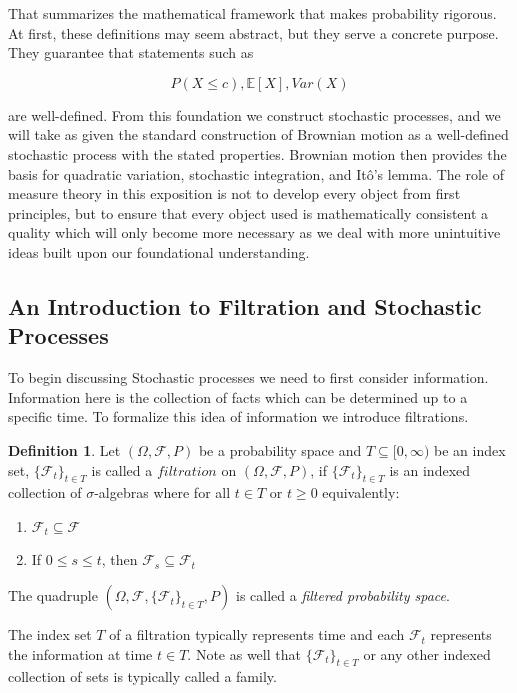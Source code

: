 \documentclass[12pt]{article}
\theoremstyle{definition}
\newtheorem{definition}{Definition}[section]
\theoremstyle{plain}
\theoremstyle{remark}
\begin{document}
That summarizes the mathematical framework that makes probability rigorous. At first, these definitions may seem abstract, but they serve a concrete purpose. They guarantee that statements such as

$$P(X \leq c),\mathbb{E}[X],Var(X)$$

are well-defined.  From this foundation we construct stochastic processes, and we will take as given the standard construction of Brownian motion as a well-defined stochastic process with the stated properties. Brownian motion then provides the basis for quadratic variation, stochastic integration, and Itô's lemma.  The role of measure theory in this exposition is not to develop every object from first principles, but to ensure that every object used is mathematically consistent a quality which will only become more necessary as we deal with more unintuitive ideas built upon our foundational understanding.

\subsection{An Introduction to Filtration and Stochastic Processes}

To begin discussing Stochastic processes we need to first consider information.  Information here is the collection of facts which can be determined up to a specific time.  To formalize this idea of information we introduce filtrations.

\begin{definition}
Let $(\Omega, \mathcal{F},P)$ be a probability space and $T \subseteq [0,\infty) $ be an index set, $\{\mathcal{F}_t\}_{t \in T}$ is called a $\mathit{filtration}$ on $(\Omega, \mathcal{F},P)$, if $\{\mathcal{F}_t\}_{t \in T}$ is an indexed collection of $\sigma$-algebras where for all $t \in T$ or $t \geq 0$ equivalently:
\begin{enumerate}[label=(\roman*)]

\item $\mathcal{F}_t \subseteq \mathcal{F} $

\item If $0 \leq s \leq  t$, then $\mathcal{F}_s \subseteq \mathcal{F}_t$

\end{enumerate}
The quadruple $(\Omega,\mathcal{F}, \{\mathcal{F}_t\}_{t \in T} , P)$ is called a \textit{filtered probability space}.
\end{definition}

The index set $T$ of a filtration typically represents time and each $\mathcal{F}_t$ represents the information at time $t \in T$.  Note as well that $\{\mathcal{F}_t\}_{t \in T}$ or any other indexed collection of sets is typically called a family.
\end{document}
